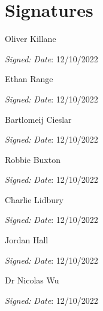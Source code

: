 \documentclass{report}
\begin{document}
\section*{Signatures}
\newcommand{\siginside}{
\textit{Signed:} \vspace{5mm}
\tcblower
\textit{Date}: 12/10/2022
}

\begin{tcbraster}[raster columns=2,raster equal height]
    \begin{signaturebox}{Oliver Killane}
        \siginside
    \end{signaturebox}
    \begin{signaturebox}{Ethan Range}
        \siginside
    \end{signaturebox}
    \begin{signaturebox}{Bartlomeij Cieslar}
        \siginside
    \end{signaturebox}
    \begin{signaturebox}{Robbie Buxton}
        \siginside
    \end{signaturebox}
    \begin{signaturebox}{Charlie Lidbury}
        \siginside
    \end{signaturebox}
    \begin{signaturebox}{Jordan Hall}
        \siginside
    \end{signaturebox}
    \begin{signaturebox}{Dr Nicolas Wu}
        \siginside
    \end{signaturebox}
\end{tcbraster}
\end{document}
